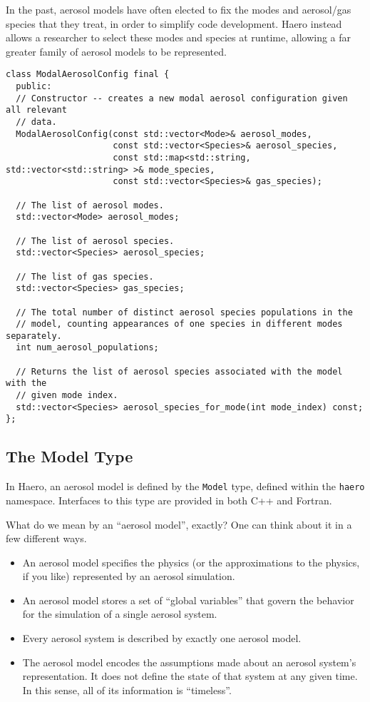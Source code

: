 In the past, aerosol models have often elected to fix the modes and aerosol/gas
species that they treat, in order to simplify code development. Haero instead
allows a researcher to select these modes and species at runtime, allowing a
far greater family of aerosol models to be represented.

\begin{lstlisting}
class ModalAerosolConfig final {
  public:
  // Constructor -- creates a new modal aerosol configuration given all relevant
  // data.
  ModalAerosolConfig(const std::vector<Mode>& aerosol_modes,
                     const std::vector<Species>& aerosol_species,
                     const std::map<std::string, std::vector<std::string> >& mode_species,
                     const std::vector<Species>& gas_species);

  // The list of aerosol modes.
  std::vector<Mode> aerosol_modes;

  // The list of aerosol species.
  std::vector<Species> aerosol_species;

  // The list of gas species.
  std::vector<Species> gas_species;

  // The total number of distinct aerosol species populations in the
  // model, counting appearances of one species in different modes separately.
  int num_aerosol_populations;

  // Returns the list of aerosol species associated with the model with the
  // given mode index.
  std::vector<Species> aerosol_species_for_mode(int mode_index) const;
};
\end{lstlisting}

\subsection{The Model Type}

In Haero, an aerosol model is defined by the \texttt{Model} type, defined within
the \texttt{haero} namespace. Interfaces to this type are provided in both C++ and
Fortran.

What do we mean by an ``aerosol model'', exactly? One can think about it in a
few different ways.

\begin{itemize}
  \item An aerosol model specifies the physics (or the approximations to the
        physics, if you like) represented by an aerosol simulation.
  \item An aerosol model stores a set of ``global variables'' that govern the
        behavior for the simulation of a single aerosol system.
  \item Every aerosol system is described by exactly one aerosol model.
  \item The aerosol model encodes the assumptions made about an aerosol system's
        representation. It does not define the state of that system at any given
        time. In this sense, all of its information is ``timeless''.
\end{itemize}


